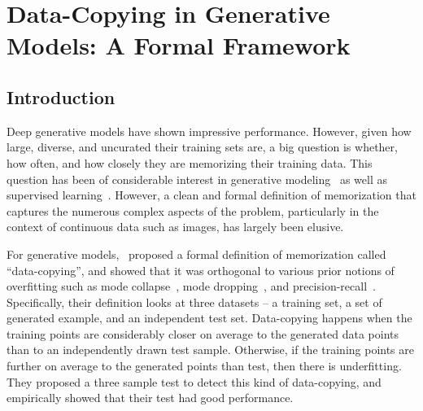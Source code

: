 \graphicspath{{./chapters/chapter4/}}
\newtheorem{theorem}[thm]{Theorem}
\newtheorem{proposition}[thm]{Proposition}
\newtheorem{lemma}[thm]{Lemma}
\newtheorem{corollary}[thm]{Corollary}
\newtheorem{definition}[thm]{Definition}
\newtheorem{assumption}[thm]{Assumption}
\newtheorem{remark}[thm]{Remark}

\def\c{cr}
\def\hc{\hat{cr}}
\def\d{\Lambda}
\def\ind{\mathbbm{1}}
\def\oc{Online\_Cluster}
\def\mem{\mathcal M}
\def\E{\mathbb{E}}
\def\R{\mathbb{R}}
\def\O{\mathcal{O}}
\def\calP{\mathcal{P}}
\def\dc{Data\_Copy\_Detect}
\def\a{\kappa}
\def\hq{\widehat{q(B(x, r))}}
\def\alpaca{\epsilon}

\chapter{Data-Copying in Generative Models: A Formal Framework} 

\section{Introduction}

Deep generative models have shown impressive performance. However, given how large, diverse, and uncurated their training sets are, a big question is whether, how often, and how closely they are memorizing their training data. This question has been of considerable interest in generative modeling~\citep{lopez2016revisiting,XHYGSWK18} as well as supervised learning~\citep{BBFST21, Feldman20}. However, a clean and formal definition of memorization that captures the numerous complex aspects of the problem, particularly in the context of continuous data such as images, has largely been elusive.

For generative models,~\cite{MCD2020} proposed a formal definition of memorization called ``data-copying'', and showed that it was orthogonal to various prior notions of overfitting such as mode collapse~\citep{TT20}, mode dropping~\citep{YFWYC20}, and precision-recall~\citep{SBLBG18}. Specifically, their definition looks at three datasets -- a training set, a set of generated example, and an independent test set. Data-copying happens when the training points are considerably closer on average to the generated data points than to an independently drawn test sample. Otherwise, if the training points are further on average to the generated points than test, then there is underfitting. They proposed a three sample test to detect this kind of data-copying, and empirically showed that their test had good performance.

